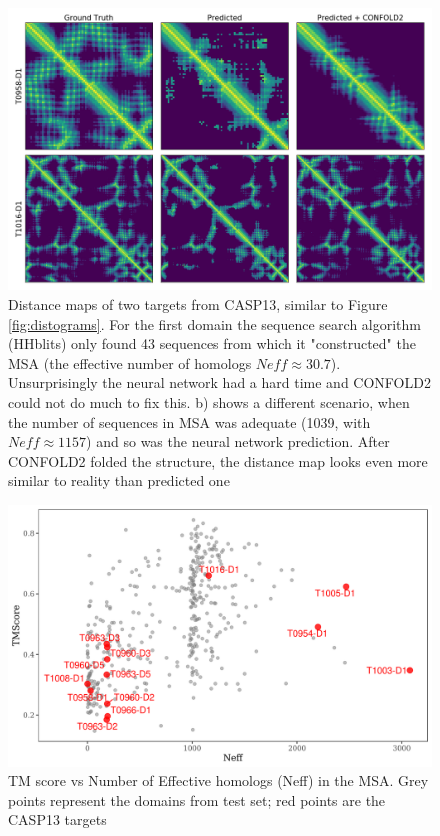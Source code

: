 \begin{figure}
    \centering
    \includegraphics[width=\linewidth]{imgs_tomas/casp_distance_maps_test_structures.png}
    \caption{Distance maps of two targets from CASP13, similar to Figure \ref{fig:distograms}. For the first domain the sequence search algorithm (HHblits) only found 43 sequences from which it "constructed" the MSA (the effective number of homologs $Neff \approx 30.7$).  Unsurprisingly the neural network had a hard time and CONFOLD2 could not do much to fix this. b) shows a different scenario, when the number of sequences in MSA was adequate (1039, with $Neff \approx 1157$) and so was the neural network prediction. After CONFOLD2 folded the structure, the distance map looks even more similar to reality than predicted one}
    \label{fig:casp_distmaps}
\end{figure}

\begin{figure}
    \centering
    \includegraphics[width=\linewidth]{imgs_tomas/tm_vs_neff.png}
    \caption{TM score vs Number of Effective homologs (Neff) in the MSA. Grey points represent the domains from test set; red points are the CASP13 targets}
    \label{fig:tm_vs_neff}
\end{figure}

